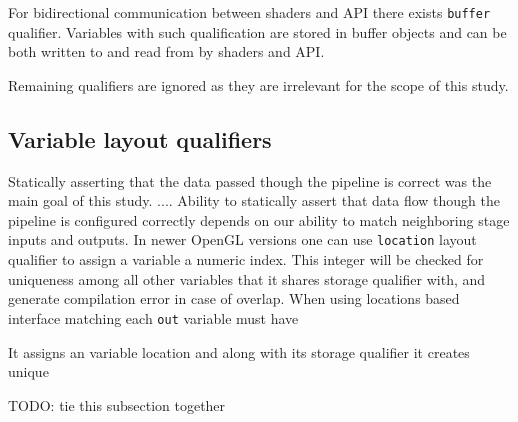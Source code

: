 For bidirectional communication between shaders and API there exists \texttt{buffer} qualifier. Variables with such qualification are stored in buffer objects and can be both written to and read from by shaders and API.

Remaining qualifiers are ignored as they are irrelevant for the scope of this study.

\subsection{Variable layout qualifiers}

Statically asserting that the data passed though the pipeline is correct was the main goal of this study.  ....
Ability to statically assert that data flow though the pipeline is configured correctly depends on our ability to match neighboring stage inputs and outputs.
In newer OpenGL versions one can use \texttt{location} layout qualifier to assign a variable a numeric index.
This integer will be checked for uniqueness among all other variables that it shares storage qualifier with, and generate compilation error in case of overlap.
When using locations based interface matching each \texttt{out} variable must have

It assigns an variable location and along with its storage qualifier it creates unique 

TODO: tie this subsection together

